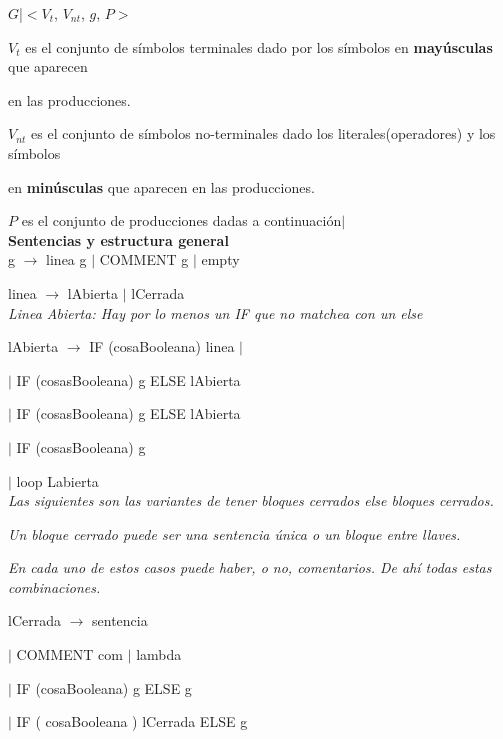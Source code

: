 \linespread{1.125}\selectfont

$G$|$<V_{t}$, $V_{nt}$, $g$, $P>$

$V_{t}$ es el conjunto de símbolos terminales dado por los símbolos en \textbf{mayúsculas} que aparecen 

en las producciones.


$V_{nt}$ es el conjunto de símbolos no-terminales dado los literales(operadores) y los símbolos

en \textbf{minúsculas} que aparecen en las producciones.



$P$ es el conjunto de producciones dadas a continuación$|$\\


\textbf{Sentencias y estructura general} \\

g $\rightarrow$ linea g $|$ COMMENT g $|$ empty 

linea $\rightarrow$ lAbierta $|$ lCerrada \\


\textit{Linea Abierta: Hay por lo menos un IF que no matchea con un else} 

lAbierta $\rightarrow$ IF (cosaBooleana) linea $|$

\hspace{15mm}$|$ IF (cosasBooleana) {g} ELSE lAbierta

\hspace{15mm}$|$ IF (cosasBooleana) {g} ELSE lAbierta

\hspace{15mm}$|$ IF (cosasBooleana) {g} 

\hspace{15mm}$|$ loop Labierta \\

\textit{Las siguientes son las variantes de tener bloques cerrados else bloques cerrados.}

\textit{Un bloque cerrado puede ser una sentencia única o un bloque entre llaves.}

\textit{En cada uno de estos casos puede haber, o no, comentarios. De ahí todas estas combinaciones.} 


lCerrada $\rightarrow$ sentencia

\hspace{15mm}$|$ COMMENT com $|$ lambda

\hspace{15mm}$|$ IF (cosaBooleana) {g} ELSE {g}

\hspace{15mm}$|$ IF ( cosaBooleana ) lCerrada ELSE { g } 

